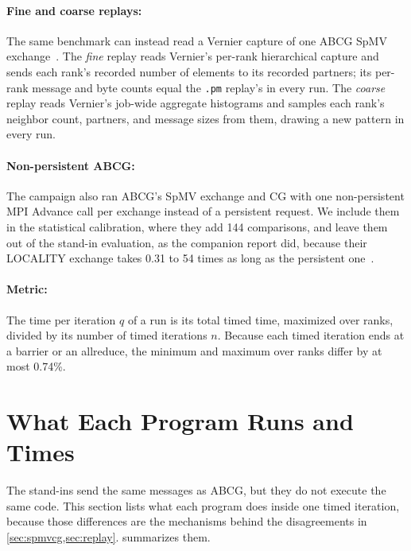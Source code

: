 \documentclass[11pt]{article}
\newcommand{\pmrep}{\texttt{.pm} replay}
\begin{document}
\paragraph{Fine and coarse replays:} The same benchmark can instead read a Vernier capture
of one ABCG SpMV exchange~\cite{vernier2025}. The \emph{fine} replay reads Vernier's
per-rank hierarchical capture and sends each rank's recorded number of elements to its
recorded partners; its per-rank message and byte counts equal the \pmrep's in every run.
The \emph{coarse} replay reads Vernier's job-wide aggregate histograms and samples each
rank's neighbor count, partners, and message sizes from them, drawing a new pattern in
every run.

\paragraph{Non-persistent ABCG:} The campaign also ran ABCG's SpMV exchange and CG with one
non-persistent MPI Advance call per exchange instead of a persistent request. We include
them in the statistical calibration, where they add 144 comparisons, and leave them out of
the stand-in evaluation, as the companion report did, because their LOCALITY exchange takes
0.31 to 54 times as long as the persistent one~\cite{ladderreport}.

\paragraph{Metric:} The time per iteration $q$ of a run is its total timed time, maximized
over ranks, divided by its number of timed iterations $n$. Because each timed iteration
ends at a barrier or an allreduce, the minimum and maximum over ranks differ by at most
0.74\%.

\section{What Each Program Runs and Times}
\label{sec:codepaths}

The stand-ins send the same messages as ABCG, but they do not execute the same code. This
section lists what each program does inside one timed iteration, because those differences
are the mechanisms behind the disagreements in \cref{sec:spmvcg,sec:replay}.
 summarizes them.
\end{document}

